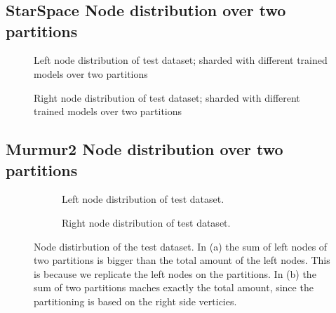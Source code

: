 \chapter{\appendixname}
\section*{StarSpace Node distribution over two partitions}

\begin{figure}[!hbt]
	\centering
	
	\caption{Left node distribution of test dataset; sharded with different trained models over two partitions}
	\label{plot:left-node-distribution}
\end{figure}

\begin{figure}[!hbt]
	\centering
	
	\caption{Right node distribution of test dataset; sharded with different trained models over two partitions}
	\label{plot:right-node-distribution}
\end{figure}

\section*{Murmur2 Node distribution over two partitions}
\begin{figure}[!hbt]
    \centering
	\begin{subfigure}{\textwidth}
		\centering
		
		\caption{Left node distribution of test dataset.}
		\label{plot:left-node-distribution-murmur2}
    \end{subfigure}\qquad

    \begin{subfigure}{\textwidth}
		\centering
		
		\caption{Right node distribution of test dataset.}
		\label{plot:right-node-distribution-murmur2}
    \end{subfigure}\qquad
    
    \caption{Node distirbution of the test dataset. In (a) the sum of left nodes of two partitions is bigger than the total amount of the left nodes. This is because we replicate the left nodes on the partitions. In (b) the sum of two partitions maches exactly the total amount, since the partitioning is based on the right side verticies.}
\end{figure}